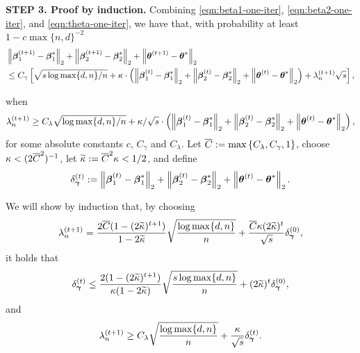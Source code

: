 \medskip
\noindent
\textbf{STEP 3. Proof by induction.}
Combining \eqref{eqn:beta1-one-iter},  \eqref{eqn:beta2-one-iter}, and \eqref{eqn:theta-one-iter}, we have that, with probability at least $1-c\max\{n, d\}^{-2}$
\begin{equation}\label{eq:cgamma}
	\begin{aligned}
		&\left\lVert\boldsymbol{\beta}^{(t+1)}_1 - \boldsymbol{\beta}_1^*\right\rVert_2 + \left\lVert\boldsymbol{\beta}^{(t+1)}_2 - \boldsymbol{\beta}_2^*\right\rVert_2 + \left\lVert\boldsymbol{\theta}^{(t+1)} - \boldsymbol{\theta}^*\right\rVert_2 \\
		&\leq C_{\gamma} \left[ 
			\sqrt{s \log \max\{d,n\} / n} 
			+ \kappa\cdot\left( \left\lVert\boldsymbol{\beta}_1^{(t)} - \boldsymbol{\beta}_1^*\right\rVert_2 + \left\lVert\boldsymbol{\beta}_2^{(t)} - \boldsymbol{\beta}_2^*\right\rVert_2 + \left\lVert\boldsymbol{\theta}^{(t)} - \boldsymbol{\theta}^*\right\rVert_2 \right)
			+ 
			\lambda_n^{(t+1)}\sqrt{s} \right], 
	\end{aligned}
\end{equation}

when
\begin{equation*}
\lambda^{(t+1)}_n \ge C_\lambda \sqrt{\log \max\{d,n\} / n} + \kappa/\sqrt{s}\cdot\left( \left\lVert\boldsymbol{\beta}_1^{(t)} - \boldsymbol{\beta}_1^*\right\rVert_2 + \left\lVert\boldsymbol{\beta}_2^{(t)} - \boldsymbol{\beta}_2^*\right\rVert_2 + \left\lVert\boldsymbol{\theta}^{(t)} - \boldsymbol{\theta}^*\right\rVert_2 \right),
\end{equation*}
for some absolute constants $c$, $C_{\gamma}$ and $C_{\lambda}$. Let $\overline{C}: = \max\left\{ C_{\lambda}, C_{\gamma}, 1 \right\}$, choose $\kappa<(2\overline{C}^2)^{-1}$,  let $\widetilde\kappa:=\overline{C}^2\kappa<1/2$, and define
\[\delta_{\boldsymbol{\gamma}}^{(t)}:=  \left\lVert\boldsymbol{\beta}_1^{(t)} - \boldsymbol{\beta}_1^*\right\rVert_2 + \left\lVert\boldsymbol{\beta}_2^{(t)} - \boldsymbol{\beta}_2^*\right\rVert_2 + \left\lVert\boldsymbol{\theta}^{(t)} - \boldsymbol{\theta}^*\right\rVert_2.\]

We will show by induction that, by choosing 
\[\lambda_n^{(t+1)}=\frac{2\overline{C}(1-(2\widetilde\kappa)^{t+1})}{1-2\widetilde\kappa}\sqrt{\frac{\log \max\{d,n\}}{n}}+\frac{\overline{C}\kappa(2\widetilde\kappa)^{t}}{\sqrt{s}}\delta_{\boldsymbol{\gamma}}^{(0)}, \]
it holds that
\[\delta_{\boldsymbol{\gamma}}^{(t)} \leq \frac{2(1-(2\widetilde\kappa)^{t+1})}{\kappa(1-2\widetilde\kappa)}\sqrt{\frac{s\log \max\{d,n\}}{n}}+(2\widetilde\kappa)^t\delta_{\boldsymbol{\gamma}}^{(0)}, \]
and 
\[\lambda_n^{(t+1)} \geq C_\lambda\sqrt{\frac{\log \max\{d,n\}}{n}} + \frac{\kappa}{\sqrt{s}}\delta_{\boldsymbol{\gamma}}^{(t)}.\]

